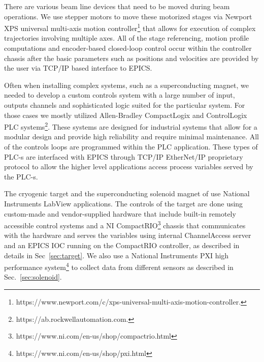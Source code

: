 There are various beam line devices that need to be moved during beam operations. We use stepper motors to move these motorized stages via Newport XPS universal multi-axis motion controller\footnote{https://www.newport.com/c/xps-universal-multi-axis-motion-controller.} that allows for execution of complex trajectories involving multiple axes. All of the stage referencing, motion profile computations and encoder-based closed-loop control occur within the controller chassis after the basic parameters such as positions and velocities are provided by the user via TCP/IP based interface to EPICS.   

Often when installing complex systems, such as a superconducting magnet, we needed to develop a custom controls system with a large number of input, outputs channels and sophisticated logic suited for the particular system. For those cases we mostly  utilized Allen-Bradley CompactLogix and ControlLogix PLC systems\footnote{https://ab.rockwellautomation.com.}. These systems are designed for industrial systems that allow for a modular design and provide high reliability and require minimal maintenance. All of the controls loops are programmed within the PLC application. These types of PLC-s are interfaced with EPICS through TCP/IP EtherNet/IP proprietary protocol to allow the higher level applications access process variables served by the PLC-s.  

The cryogenic target and the superconducting solenoid magnet of \gx{} use National Instruments LabView applications. The controls of the target are done using custom-made and vendor-supplied hardware that include built-in remotely accessible control systems and a NI CompactRIO\footnote{https://www.ni.com/en-us/shop/compactrio.html} chassis that communicates with the hardware and serves the variables using internal ChannelAccess server and an EPICS IOC running on the CompactRIO controller, as described in details in Sec~\ref{sec:target}. We also use a National Instruments PXI high performance system\footnote{https://www.ni.com/en-us/shop/pxi.html} to collect data from different sensors as described in Sec.~\ref{sec:solenoid}. 


